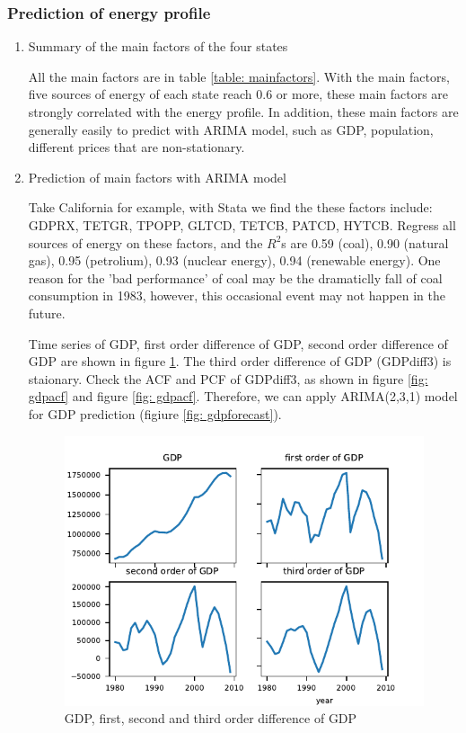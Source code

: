 \subsubsection{Prediction of energy profile}
\begin{enumerate}
\item{Summary of the main factors of the four states}\par
All the main factors are in table \ref{table: mainfactors}. With the main factors, five sources of energy of each state reach 0.6 or more, these main factors are strongly correlated with the energy profile. In addition, these main factors are generally easily to predict with ARIMA model, such as GDP, population, different prices that are non-stationary.


\item{Prediction of main factors with ARIMA model}\par
Take California for example, with Stata we find the these factors include: GDPRX, TETGR, TPOPP, GLTCD, TETCB, PATCD, HYTCB. Regress all sources of energy on these factors, and the $R^2$s are 0.59 (coal), 0.90 (natural gas), 0.95 (petrolium), 0.93 (nuclear energy), 0.94 (renewable energy). One reason for the 'bad performance' of coal may be the dramaticlly fall of coal consumption in 1983, however, this occasional event may not happen in the future. 

    Time series of GDP, first order difference of GDP, second order difference of GDP are shown in figure \ref{fig: gdp_diff}. The third order difference of GDP (GDPdiff3) is staionary. Check the ACF and PCF of GDPdiff3, as shown in figure \ref{fig: gdpacf} and figure \ref{fig: gdpacf}. Therefore, we can apply ARIMA(2,3,1) model for GDP prediction (figiure \ref{fig: gdpforecast}).
    
    \begin{figure}[H] 
    \centering 
    \includegraphics[width=0.5\linewidth]{fig/gdp_diff.pdf}
    \caption{GDP, first, second and third order difference of GDP}
    \label{fig: gdp_diff}
\end{figure}


\end{enumerate}
